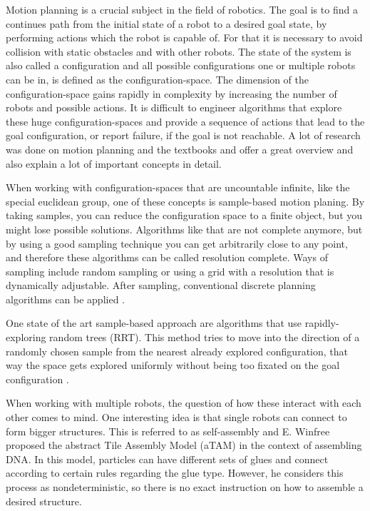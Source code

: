 Motion planning is a crucial subject in the field of robotics.
The goal is to find a continues path from the initial state of a robot to a desired goal state, by performing actions which the robot is capable of.
For that it is necessary to avoid collision with static obstacles and with other robots.
The state of the system is also called a configuration and all possible configurations one or multiple robots can be in, is defined as the configuration-space.
The dimension of the configuration-space gains rapidly in complexity by increasing the number of robots and possible actions.
It is difficult to engineer algorithms that explore these huge configuration-spaces and provide a sequence of actions that lead to the goal configuration, or report failure, if the goal is not reachable.
A lot of research was done on motion planning and the textbooks \cite{LaValle2006} and \cite{Mueller2019} offer a great overview and also explain a lot of important concepts in detail.

When working with configuration-spaces that are uncountable infinite, like the special euclidean group, one of these concepts is sample-based motion planing.
By taking samples, you can reduce the configuration space to a finite object, but you might lose possible solutions.
Algorithms like that are not complete anymore, but by using a good sampling technique you can get arbitrarily close to any point, and therefore these algorithms can be called resolution complete.
Ways of sampling include random sampling or using a grid with a resolution that is dynamically adjustable.
After sampling, conventional discrete planning algorithms can be applied \cite{LaValle2006}.

One state of the art sample-based approach are algorithms that use rapidly-exploring random trees (RRT).
This method tries to move into the direction of a randomly chosen sample from the nearest already explored configuration, that way the space gets explored uniformly without being too fixated on the goal configuration \cite{lavalle1998,lavalle2001}.

When working with multiple robots, the question of how these interact with each other comes to mind.
One interesting idea is that single robots can connect to form bigger structures.
This is referred to as self-assembly and E. Winfree \cite{winfree1998} proposed the abstract Tile Assembly Model (aTAM) in the context of assembling DNA.
In this model, particles can have different sets of glues and connect according to certain rules regarding the glue type.
However, he considers this process as nondeterministic, so there is no exact instruction on how to assemble a desired structure.

